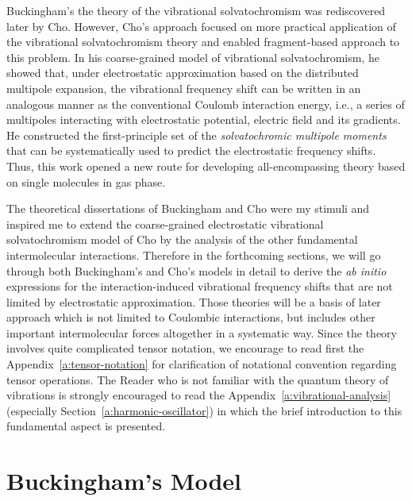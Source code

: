 \documentclass[b5paper,oneside,fleqn,11pt]{book}
\begin{document}
\begin{refsection}
Buckingham's the theory of the vibrational solvatochromism was rediscovered later 
by Cho. \citep{Cho.JCP.2003,Cho.JCP.2009} 
However, Cho's 
approach focused on more practical application of the vibrational solvatochromism 
theory and enabled fragment\hyp{}based approach to this problem. In his coarse\hyp{}grained
model of vibrational solvatochromism, he showed that,
under electrostatic approximation based on the distributed multipole expansion, 
the vibrational frequency shift can be written in an analogous manner as the conventional
Coulomb interaction energy, i.e., a series of multipoles interacting with
electrostatic potential, electric field and its gradients. 
He constructed the first\hyp{}principle set of 
the \emph{solvatochromic multipole moments} that can be systematically used
to predict the electrostatic frequency shifts. Thus, this work opened a new route for developing
all\hyp{}encompassing theory based on single molecules in gas phase.

The theoretical dissertations of Buckingham and Cho were my stimuli and inspired
me to extend the coarse\hyp{}grained electrostatic vibrational solvatochromism 
model of Cho by the analysis of the other fundamental intermolecular interactions.
Therefore in the forthcoming sections, we will go through both Buckingham's and Cho's
models in detail
to derive the \emph{ab initio} expressions for the interaction\hyp{}induced 
vibrational frequency shifts that are not limited by electrostatic approximation.
Those theories will be a basis of later approach which is not limited to
Coulombic interactions, but includes other important intermolecular forces altogether
in a systematic way. Since the theory involves quite complicated
tensor notation, we encourage to read first the Appendix~\ref{a:tensor-notation}
for clarification of notational convention regarding tensor operations.
The Reader who is not familiar with the quantum theory of vibrations is strongly encouraged
to read the Appendix~\ref{a:vibrational-analysis} 
(especially Section~\ref{a:harmonic-oscillator})
in which the brief introduction to this fundamental aspect is presented.

\section{Buckingham's Model  \label{s:buckingham-theory}}


\end{refsection}
\end{document}
